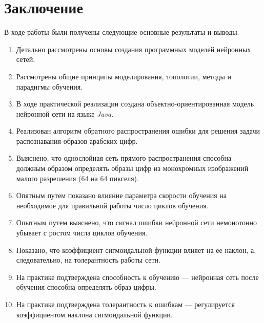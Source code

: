 \section*{\centering Заключение}

В ходе работы были получены следующие основные результаты и выводы.
\begin{enumerate}
\item Детально рассмотрены основы создания программных моделей нейронных сетей.

\item Рассмотрены общие принципы моделирования, топологии, методы и парадигмы обучения.

\item В ходе практической реализации  создана объектно-ориентированная модель нейронной сети на языке {\it Java}.

\item Реализован алгоритм обратного распространения ошибки для решения задачи распознавания образов арабских цифр.

\item Выяснено, что однослойная сеть прямого распространения способна должным образом определять образы цифр из монохромных изображений малого разрешения (64 на 64 пикселя).

\item Опятным путем  показано влияние параметра скорости обучения на необходимое для правильной работы число циклов обучения.

\item Опытным путем выяснено, что сигнал ошибки нейронной сети немонотонно убывает с ростом числа циклов обучения.

\item Показано, что коэффициент сигмоидальной функции влияет на ее наклон, а, следовательно, на толерантность работы сети.

\item На практике подтверждена способность к обучению --- нейронная сеть после обучения способна определять образ цифры.

\item На практике подтверждена толерантность к ошибкам --- регулируется коэффициентом наклона сигмоидальной функции.
\end{enumerate}

\newpage